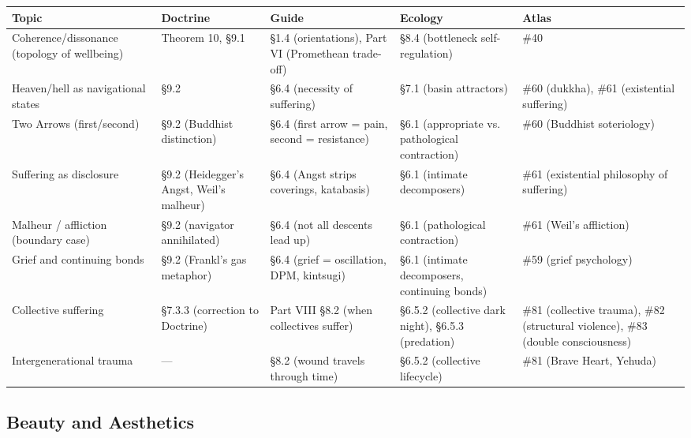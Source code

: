 \begin{longtable}{p{} p{} p{} p{} p{}}
\toprule
\textbf{Topic} & \textbf{Doctrine} & \textbf{Guide} & \textbf{Ecology} & \textbf{Atlas} \\
\midrule
\endhead
Coherence/dissonance (topology of wellbeing) & Theorem 10, §9.1 & §1.4 (orientations), Part VI (Promethean trade-off) & §8.4 (bottleneck self-regulation) & \#40 \\
Heaven/hell as navigational states & §9.2 & §6.4 (necessity of suffering) & §7.1 (basin attractors) & \#60 (dukkha), \#61 (existential suffering) \\
Two Arrows (first/second) & §9.2 (Buddhist distinction) & §6.4 (first arrow = pain, second = resistance) & §6.1 (appropriate vs. pathological contraction) & \#60 (Buddhist soteriology) \\
Suffering as disclosure & §9.2 (Heidegger's Angst, Weil's malheur) & §6.4 (Angst strips coverings, katabasis) & §6.1 (intimate decomposers) & \#61 (existential philosophy of suffering) \\
Malheur / affliction (boundary case) & §9.2 (navigator annihilated) & §6.4 (not all descents lead up) & §6.1 (pathological contraction) & \#61 (Weil's affliction) \\
Grief and continuing bonds & §9.2 (Frankl's gas metaphor) & §6.4 (grief = oscillation, DPM, kintsugi) & §6.1 (intimate decomposers, continuing bonds) & \#59 (grief psychology) \\
Collective suffering & §7.3.3 (correction to Doctrine) & Part VIII §8.2 (when collectives suffer) & §6.5.2 (collective dark night), §6.5.3 (predation) & \#81 (collective trauma), \#82 (structural violence), \#83 (double consciousness) \\
Intergenerational trauma & — & §8.2 (wound travels through time) & §6.5.2 (collective lifecycle) & \#81 (Brave Heart, Yehuda) \\
\bottomrule
\end{longtable}



\subsection*{Beauty and Aesthetics}



